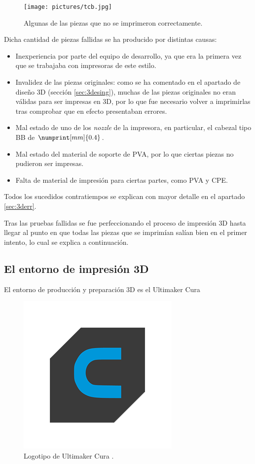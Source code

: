 \begin{figure}[H]
    \centering
    \texttt{[image: pictures/tcb.jpg]}
    \caption{Algunas de las piezas que no se imprimeron correctamente.}
    \label{fig:tcb}
\end{figure}

Dicha cantidad de piezas fallidas se ha producido por distintas causas:

\begin{itemize}
    \item Inexperiencia por parte del equipo de desarrollo, ya que era la primera vez
    que se trabajaba con impresoras de este estilo.

    \item Invalidez de las piezas originales: como se ha comentado en el apartado de
    diseño 3D (sección \ref{sec:3desing}), muchas de las piezas originales no eran
    válidas para ser impresas en 3D, por lo que fue necesario volver a imprimirlas
    tras comprobar que en efecto presentaban errores.

    \item Mal estado de uno de los \textit{nozzle} de la impresora, en particular,
    el cabezal tipo BB de $\numprint[mm]{0.4}$.

    \item Mal estado del material de soporte de \ac{PVA}, por lo que ciertas piezas
    no pudieron ser impresas.

    \item Falta de material de impresión para ciertas partes, como \ac{PVA} y \ac{CPE}.
\end{itemize}

Todos los sucedidos contratiempos se explican con mayor detalle en el apartado
\ref{sec:3derr}.

Tras las pruebas fallidas se fue perfeccionando el proceso de impresión 3D hasta llegar
al punto en que todas las piezas que se imprimían salían bien en el primer intento, lo
cual se explica a continuación.

\subsection{El entorno de impresión 3D}
El entorno de producción y preparación 3D es el Ultimaker Cura

\begin{figure}[H]
    \centering
    \includegraphics[width=.5\linewidth]{pictures/Ultimaker_cura.png}
    \caption*{Logotipo de Ultimaker Cura \cite{CuraSoftware2019}.}
\end{figure}

